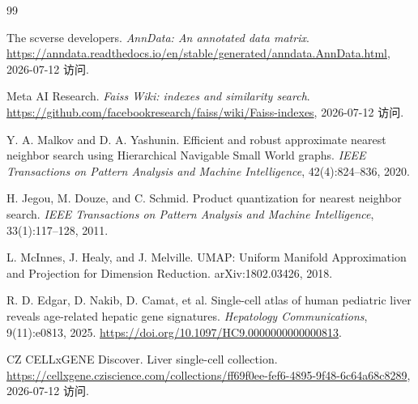 \documentclass[11pt,a4paper]{article}
\begin{document}
\begin{thebibliography}{99}

The scverse developers.
\newblock \emph{AnnData: An annotated data matrix}.
\newblock \url{https://anndata.readthedocs.io/en/stable/generated/anndata.AnnData.html}, 2026-07-12 访问.

Meta AI Research.
\newblock \emph{Faiss Wiki: indexes and similarity search}.
\newblock \url{https://github.com/facebookresearch/faiss/wiki/Faiss-indexes}, 2026-07-12 访问.

Y. A. Malkov and D. A. Yashunin.
\newblock Efficient and robust approximate nearest neighbor search using Hierarchical Navigable Small World graphs.
\newblock \emph{IEEE Transactions on Pattern Analysis and Machine Intelligence}, 42(4):824--836, 2020.

H. Jegou, M. Douze, and C. Schmid.
\newblock Product quantization for nearest neighbor search.
\newblock \emph{IEEE Transactions on Pattern Analysis and Machine Intelligence}, 33(1):117--128, 2011.

L. McInnes, J. Healy, and J. Melville.
\newblock UMAP: Uniform Manifold Approximation and Projection for Dimension Reduction.
\newblock arXiv:1802.03426, 2018.

R. D. Edgar, D. Nakib, D. Camat, et al.
\newblock Single-cell atlas of human pediatric liver reveals age-related hepatic gene signatures.
\newblock \emph{Hepatology Communications}, 9(11):e0813, 2025.
\newblock \url{https://doi.org/10.1097/HC9.0000000000000813}.

CZ CELLxGENE Discover.
\newblock Liver single-cell collection.
\newblock \url{https://cellxgene.cziscience.com/collections/ff69f0ee-fef6-4895-9f48-6c64a68c8289}, 2026-07-12 访问.

\end{thebibliography}
\end{document}
